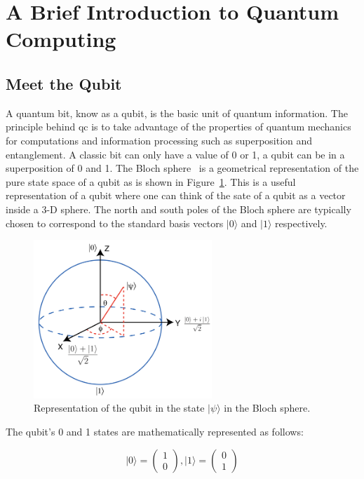 \section{A Brief Introduction to Quantum Computing}
\label{sec:qc}

\subsection{Meet the Qubit}
\label{sec:qubit}

A quantum bit, know as a qubit, is the basic unit of quantum information. The 
principle behind \gls{qc} is to take advantage of the properties of quantum 
mechanics for computations and information processing such as superposition and 
entanglement. A classic bit can only have a value of 0 or 1, a qubit can be in a
superposition of 0 and 1. The Bloch sphere~\cite{Bloch} is a geometrical 
representation of the pure state space of a qubit as is shown in Figure~\ref{fig:bloch}. 
This is a useful representation of a qubit where one can think of the sate of a 
qubit as a vector inside a 3-D sphere. The north and south poles of the Bloch 
sphere are typically chosen to correspond to the standard basis vectors $\vert 0 \rangle$
and $\vert 1 \rangle$ respectively.

\begin{figure}[!htbp]
\centering
	\includegraphics[width=0.60\textwidth]{figures/Bloch_sphere.png}
\caption{Representation of the qubit in the state $\vert \psi \rangle$ in the
Bloch sphere.}
\label{fig:bloch}
\end{figure}

The qubit's 0 and 1 states are mathematically represented as follows:

\begin{linenomath}
\begin{equation}
	\vert 0 \rangle = \begin{pmatrix} 1 \\ 0 \end{pmatrix}, \vert 1 \rangle = \begin{pmatrix} 0 \\ 1 \end{pmatrix}
\label{eq:qu01}
\end{equation}
\end{linenomath}

